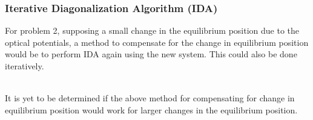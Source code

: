 \documentclass[10pt]{beamer}
\begin{document}
\begin{frame}
\frametitle{Iterative Diagonalization Algorithm (IDA)}
For problem 2, supposing a small change in the equilibrium position due to the optical potentials, a method to compensate for the change in equilibrium position would be to perform IDA again using the new system. This could also be done iteratively. \\[10pt]

 \\[10pt]

It is yet to be determined if the above method for compensating for change in equilibrium position would work for larger changes in the equilibrium position.
\end{frame}
\end{document}
